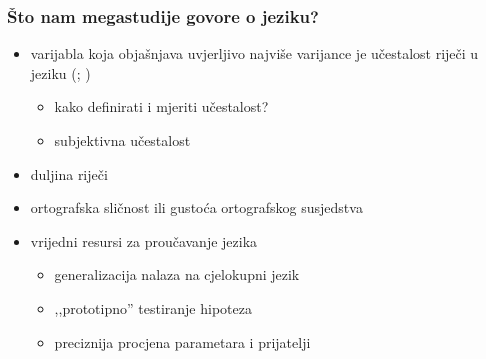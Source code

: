 \documentclass{beamer}
\newcommand{\tinycitep}[1]{%
    \bgroup
    \scriptsize
    \citep{#1}
    \egroup}
\begin{document}
\begin{frame}
    \frametitle{Što nam megastudije govore o jeziku?}

    \begin{itemize}
        \item varijabla koja objašnjava uvjerljivo najviše varijance je
            učestalost riječi u jeziku
            \bgroup
            \scriptsize
            (\citealp*{balotaVisualWordRecognition2006};
            \citealp[ch. 6]{harleyPsychologyLanguageData2014})
            \egroup
        \begin{itemize}
            \pause

            \item kako definirati i mjeriti učestalost?

            \pause

            \item subjektivna učestalost
        \end{itemize}

        \pause

        \item duljina riječi \tinycitep{ferrandMEGALEXMegastudyVisual2018,
            brysbaertImpactWordPrevalence2016}

        \pause

        \item ortografska sličnost ili gustoća ortografskog susjedstva
            \tinycitep{coltheartAccessInternalLexicon1977,
            yarkoniMovingColtheartNew2008}
    \end{itemize}
\end{frame}

\begin{frame}
    \begin{itemize}
        \item vrijedni resursi za proučavanje jezika

        \begin{itemize}
            \item generalizacija nalaza na cjelokupni jezik
                \tinycitep{yarkoniGeneralizabilityCrisis2019}

            \pause

            \item ,,prototipno'' testiranje hipoteza

            \pause

            \item preciznija procjena parametara i prijatelji
                \tinycitep{yarkoniChoosingPredictionExplanation2017}
        \end{itemize}

    \end{itemize}
\end{frame}
\end{document}

